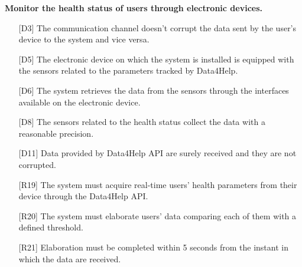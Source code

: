 \begin{enumerate} [resume, label={\bf[G\arabic*]}]
    \item \textbf{Monitor the health status of users through electronic devices.}
        \begin{itemize}
            \item [{[D3]}] The communication channel doesn't corrupt the data sent by the user's device to the system and vice versa.
            \item [{[D5]}] The electronic device on which the system is installed is equipped with the sensors related to the parameters tracked by Data4Help.
            \item [{[D6]}] The  system  retrieves  the  data  from  the  sensors  through  the  interfaces available on the electronic device.
            \item [{[D8]}] The sensors related to the health status collect the data with a reasonable precision.
            \item [{[D11]}] Data  provided  by  Data4Help  API  are  surely  received  and  they  are  not corrupted.
            \item [{[R19]}] The system must acquire real-time users' health parameters from their device through the Data4Help API.
            \item [{[R20]}] The system must elaborate users' data comparing each of them with a defined threshold. 
            \item [{[R21]}] Elaboration must be completed within 5 seconds from the instant in which the data are received.
        \end{itemize}
        

\end{enumerate}
